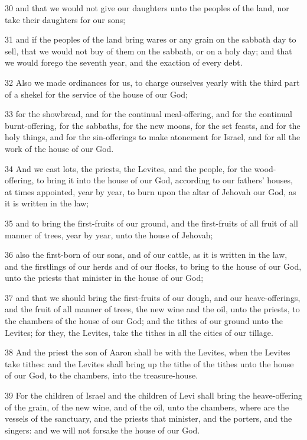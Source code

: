 \par 30 and that we would not give our daughters unto the peoples of the land, nor take their daughters for our sons;
\par 31 and if the peoples of the land bring wares or any grain on the sabbath day to sell, that we would not buy of them on the sabbath, or on a holy day; and that we would forego the seventh year, and the exaction of every debt.
\par 32 Also we made ordinances for us, to charge ourselves yearly with the third part of a shekel for the service of the house of our God;
\par 33 for the showbread, and for the continual meal-offering, and for the continual burnt-offering, for the sabbaths, for the new moons, for the set feasts, and for the holy things, and for the sin-offerings to make atonement for Israel, and for all the work of the house of our God.
\par 34 And we cast lots, the priests, the Levites, and the people, for the wood-offering, to bring it into the house of our God, according to our fathers' houses, at times appointed, year by year, to burn upon the altar of Jehovah our God, as it is written in the law;
\par 35 and to bring the first-fruits of our ground, and the first-fruits of all fruit of all manner of trees, year by year, unto the house of Jehovah;
\par 36 also the first-born of our sons, and of our cattle, as it is written in the law, and the firstlings of our herds and of our flocks, to bring to the house of our God, unto the priests that minister in the house of our God;
\par 37 and that we should bring the first-fruits of our dough, and our heave-offerings, and the fruit of all manner of trees, the new wine and the oil, unto the priests, to the chambers of the house of our God; and the tithes of our ground unto the Levites; for they, the Levites, take the tithes in all the cities of our tillage.
\par 38 And the priest the son of Aaron shall be with the Levites, when the Levites take tithes: and the Levites shall bring up the tithe of the tithes unto the house of our God, to the chambers, into the treasure-house.
\par 39 For the children of Israel and the children of Levi shall bring the heave-offering of the grain, of the new wine, and of the oil, unto the chambers, where are the vessels of the sanctuary, and the priests that minister, and the porters, and the singers: and we will not forsake the house of our God.

